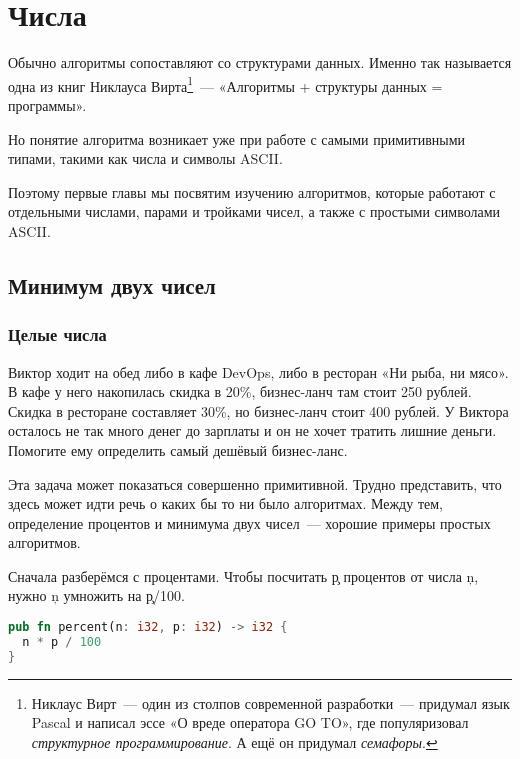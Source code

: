 \chapter{Числа}

Обычно алгоритмы сопоставляют со структурами данных.
Именно так называется одна из книг Никлауса Вирта\footnote{
  Никлаус Вирт~--- один из столпов современной разработки~--- придумал язык Pascal и написал эссе «О вреде оператора GO TO», где популяризовал {\em структурное программирование}.
  А ещё он придумал {\em семафоры}.
}~--- «Алгоритмы + структуры данных = программы».

Но понятие алгоритма возникает уже при работе с самыми примитивными типами, такими как числа и символы ASCII.

Поэтому первые главы мы посвятим изучению алгоритмов, которые работают с отдельными числами, парами и тройками чисел, а также с простыми символами ASCII.

\section{Минимум двух чисел}

\subsection{Целые числа}

\begin{Exercise}
  \Question
  Виктор ходит на обед либо в кафе DevOps, либо в ресторан «Ни рыба, ни мясо».
  В кафе у него накопилась скидка в 20\%, бизнес-ланч там стоит 250 рублей.
  Скидка в ресторане составляет 30\%, но бизнес-ланч стоит 400 рублей.
  У Виктора осталось не так много денег до зарплаты и он не хочет тратить лишние деньги.
  Помогите ему определить самый дешёвый бизнес-ланс.
\end{Exercise}

Эта задача может показаться совершенно примитивной.
Трудно представить, что здесь может идти речь о каких бы то ни было алгоритмах.
Между тем, определение процентов и минимума двух чисел~--- хорошие примеры простых алгоритмов.

Сначала разберёмся с процентами.
Чтобы посчитать \c{p} процентов от числа \c{n}, нужно \c{n} умножить на \c{p/100}.

\begin{lstlisting}[language=Rust]
pub fn percent(n: i32, p: i32) -> i32 {
  n * p / 100
}
\end{lstlisting}

